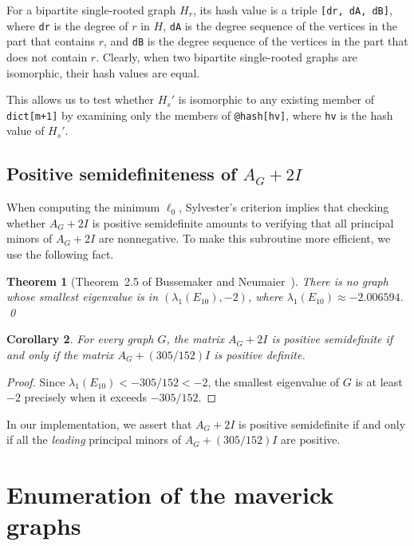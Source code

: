 \documentclass[11pt]{article}
\newtheorem{theorem}{Theorem}[section]
\newtheorem{corollary}[theorem]{Corollary}
\theoremstyle{definition}
\theoremstyle{remark}
\newcommand{\la}{\lambda}
\begin{document}
For a bipartite single-rooted graph $H_r$, its hash value is a triple \texttt{[dr, dA, dB]}, where \texttt{dr} is the degree of $r$ in $H$, \texttt{dA} is the degree sequence of the vertices in the part that contains $r$, and \texttt{dB} is the degree sequence of the vertices in the part that does not contain $r$. Clearly, when two bipartite single-rooted graphs are isomorphic, their hash values are equal.

This allows us to test whether $H_s'$ is isomorphic to any existing member of \texttt{dict[m+1]} by examining only the members of \texttt{@hash[hv]}, where \texttt{hv} is the hash value of $H_s'$.

\subsection{Positive semidefiniteness of \texorpdfstring{$A_G + 2I$}{A\_G + 2I}} \label{subsec:2}

When computing the minimum $\ell_0$, Sylvester's criterion implies that checking whether $A_G + 2I$ is positive semidefinite amounts to verifying that all principal minors of $A_G + 2I$ are nonnegative. To make this subroutine more efficient, we use the following fact.

\begin{theorem}[Theorem~2.5 of Bussemaker and Neumaier~\cite{BN92}] \label{cor:two}
    There is no graph whose smallest eigenvalue is in $(\la_1(E_{10}),-2)$, where $\la_1(E_{10}) \approx -2.006594$. \qed
\end{theorem}

\begin{corollary}
    For every graph $G$, the matrix $A_G + 2I$ is positive semidefinite if and only if the matrix $A_G + (305/152) I$ is positive definite.
\end{corollary}

\begin{proof}
    Since $\la_1(E_{10}) < -305/152 < -2$, the smallest eigenvalue of $G$ is at least $-2$ precisely when it exceeds $-305/152$.
\end{proof}

In our implementation, we assert that $A_G + 2I$ is positive semidefinite if and only if all the \emph{leading} principal minors of $A_G + (305/152)I$ are positive.

\section{Enumeration of the maverick graphs} \label{sec:maverick}
\end{document}

